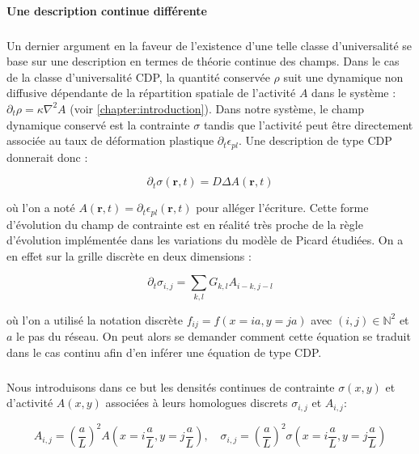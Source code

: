 \paragraph{Une description continue différente}

\subparagraph{}Un dernier argument en la faveur de l'existence d'une telle classe d'universalité se base sur une description en termes de théorie continue des champs. Dans le cas de la classe d'universalité CDP, la quantité conservée $\rho$ suit une dynamique non diffusive dépendante de la répartition spatiale de l'activité $A$ dans le système : $\partial_t \rho = \kappa\nabla^2 A$ (voir \autoref{chapter:introduction}). Dans notre système, le champ dynamique conservé est la contrainte $\sigma$ tandis que l'activité peut être directement associée au taux de déformation plastique $\partial_t \epsilon_{pl}$. Une description de type CDP donnerait donc :

\begin{equation}
	\partial_t \sigma(\mathbf{r},t) = D\Delta A(\mathbf{r},t)
\end{equation}

\noindent où l'on a noté $A(\mathbf{r},t) = \partial_t \epsilon_{pl}(\mathbf{r},t)$ pour alléger l'écriture. Cette forme d'évolution du champ de contrainte est en réalité très proche de la règle d'évolution implémentée dans les variations du modèle de Picard étudiées. On a en effet sur la grille discrète en deux dimensions :


\begin{equation}
    \partial_t\sigma_{i,j} = \sum_{k,l}G_{k,l}A_{i-k, j-l}
    \label{eq:1}
\end{equation}

\noindent où l'on a utilisé la notation discrète $f_ {ij}=f(x=ia, y=ja)$ avec $(i,j) \in \mathbb{N}^2$ et $a$ le pas du réseau. On peut alors se demander comment cette équation se traduit dans le cas continu afin d'en inférer une équation de type CDP.

\subparagraph{}Nous introduisons dans ce but les densités continues de contrainte $\sigma (x,y)$ et d'activité $A (x,y)$ associées à leurs homologues discrets  $\sigma_{i, j}$ et $A_{i, j}$:

\begin{equation}
    A_{i, j} = \left( \frac{a}{L} \right)^2A(x=i\frac{a}{L},y=j\frac{a}{L}),\quad
    \sigma_{i, j} = \left( \frac{a}{L} \right)^2\sigma(x=i\frac{a}{L},y=j\frac{a}{L})
\end{equation}

